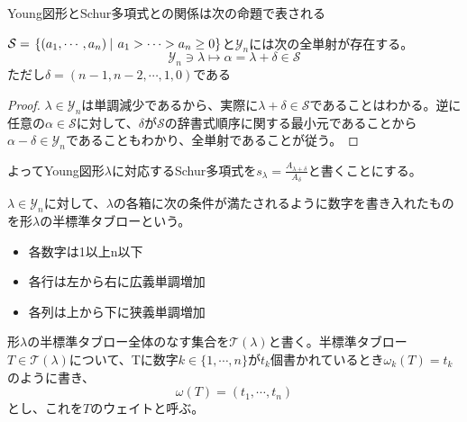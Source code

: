 \documentclass{ltjsarticle}
\begin{document}
Young図形とSchur多項式との関係は次の命題で表される
\begin{prop}
    $\mathcal{S}=\left.\left\{(a_1,\cdots,a_n) \: \right| \: a_1>\cdots>a_n\geq 0\right\}$と$\mathcal{Y}_n$には次の全単射が存在する。
    \[
    \mathcal{Y}_n\owns \lambda \mapsto \alpha=\lambda+\delta \in\mathcal{S}   
    \]
    ただし$\delta=(n-1,n-2,\cdots,1,0)$である
\end{prop}

\begin{proof}
    $\lambda\in\mathcal{Y}_n$は単調減少であるから、実際に$\lambda+\delta\in\mathcal{S}$であることはわかる。逆に任意の$\alpha\in\mathcal{S}$に対して、$\delta$が$\mathcal{S}$の辞書式順序に関する最小元であることから$\alpha-\delta\in\mathcal{Y}_n$であることもわかり、全単射であることが従う。
\end{proof}

よってYoung図形$\lambda$に対応するSchur多項式を$s_\lambda=\frac{A_{\lambda+\delta}}{A_\delta}$と書くことにする。

\begin{defin}
    $\lambda\in\mathcal{Y}_n$に対して、$\lambda$の各箱に次の条件が満たされるように数字を書き入れたものを形$\lambda$の半標準タブローという。
    \begin{itemize}
        \item 各数字は1以上n以下
        \item 各行は左から右に広義単調増加
        \item 各列は上から下に狭義単調増加
    \end{itemize}
    形$\lambda$の半標準タブロー全体のなす集合を$\mathcal{T}(\lambda)$と書く。半標準タブロー$T\in\mathcal{T}(\lambda)$について、Tに数字$k\in\{1,\cdots,n\}$が$t_k$個書かれているとき$\omega_k(T)=t_k$のように書き、
    \[
    \omega(T)=(t_1,\cdots,t_n)
    \]
    とし、これを$T$のウェイトと呼ぶ。
\end{defin}
\end{document}
